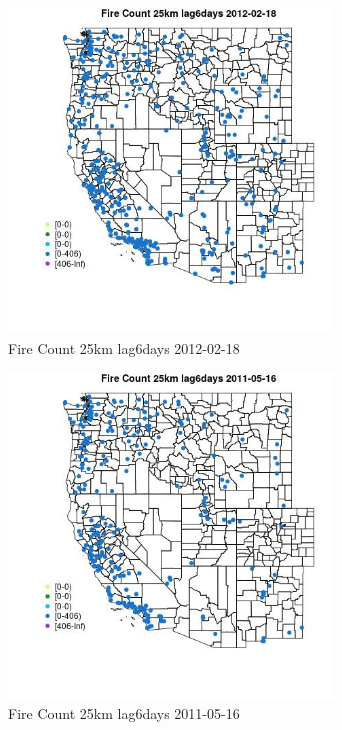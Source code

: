 \begin{figure} 
\centering  
\includegraphics[width=0.77\textwidth]{Code_Outputs/Report_ML_input_PM25_Step4_part_f_de_duplicated_aves_prioritize_24hr_obswNAs_MapObsFire_Count_25km_lag6days2012-02-18.jpg} 
\caption{\label{fig:Report_ML_input_PM25_Step4_part_f_de_duplicated_aves_prioritize_24hr_obswNAsMapObsFire_Count_25km_lag6days2012-02-18}Fire Count 25km lag6days 2012-02-18} 
\end{figure} 
 

\begin{figure} 
\centering  
\includegraphics[width=0.77\textwidth]{Code_Outputs/Report_ML_input_PM25_Step4_part_f_de_duplicated_aves_prioritize_24hr_obswNAs_MapObsFire_Count_25km_lag6days2011-05-16.jpg} 
\caption{\label{fig:Report_ML_input_PM25_Step4_part_f_de_duplicated_aves_prioritize_24hr_obswNAsMapObsFire_Count_25km_lag6days2011-05-16}Fire Count 25km lag6days 2011-05-16} 
\end{figure} 
 


